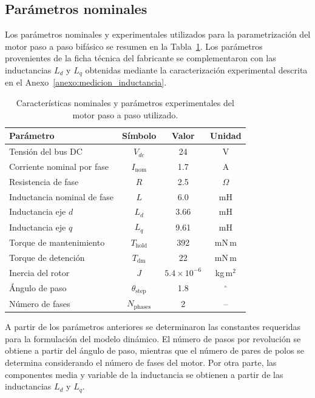 \subsection{Parámetros nominales}
Los parámetros nominales y experimentales utilizados para la
parametrización del motor paso a paso bifásico se resumen en la
Tabla~\ref{tab:parametros_nominales_motor}. Los parámetros provenientes
de la ficha técnica del fabricante se complementaron con las
inductancias $L_d$ y $L_q$ obtenidas mediante la caracterización
experimental descrita en el Anexo~\ref{anexo:medicion_inductancia}.

\begin{table}[htbp]
    \centering
    \caption{Características nominales y parámetros experimentales del
    motor paso a paso utilizado.}
    \label{tab:parametros_nominales_motor}
    \begin{tabular}{lccc}
        \hline
        \textbf{Parámetro} &
        \textbf{Símbolo} &
        \textbf{Valor} &
        \textbf{Unidad} \\
        \hline
        Tensión del bus DC
            & $V_{dc}$ & 24 & V \\
        Corriente nominal por fase
            & $I_{\mathrm{nom}}$ & 1.7 & A \\
        Resistencia de fase
            & $R$ & 2.5 & $\Omega$ \\
        Inductancia nominal de fase
            & $L$ & 6.0 & mH \\
        Inductancia eje $d$
            & $L_d$ & 3.66 & mH \\
        Inductancia eje $q$
            & $L_q$ & 9.61 & mH \\
        Torque de mantenimiento
            & $T_{\mathrm{hold}}$ & 392 & mN\,m \\
        Torque de detención
            & $T_{\mathrm{dm}}$ & 22 & mN\,m \\
        Inercia del rotor
            & $J$ & $5.4\times10^{-6}$ & kg\,m$^2$ \\
        Ángulo de paso
            & $\theta_{\mathrm{step}}$ & 1.8 & $^\circ$ \\
        Número de fases
            & $N_{\mathrm{phases}}$ & 2 & -- \\
        \hline
    \end{tabular}
\end{table}

A partir de los parámetros anteriores se determinaron las constantes
requeridas para la formulación del modelo dinámico. El número de pasos
por revolución se obtiene a partir del ángulo de paso, mientras que el
número de pares de polos se determina considerando el número de fases
del motor. Por otra parte, las componentes media y variable de la
inductancia se obtienen a partir de las inductancias $L_d$ y $L_q$.

